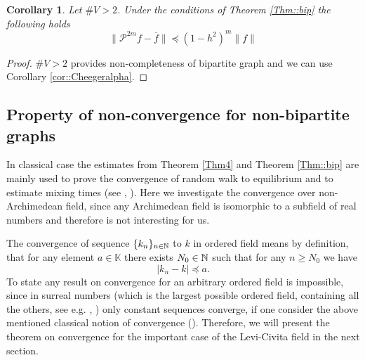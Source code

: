 \documentclass[a4paper,12pt]{amsart}
\newtheorem{corollary}{Corollary}
\theoremstyle{definition}
\renewcommand{\P}{\mathcal{P}}
\newcommand{\K}{\mathbb{K}}
\begin{document}
\begin{corollary}\label{Cor3}
Let $\#V>2$. Under the conditions of Theorem \ref{Thm::bip}  the following holds
$$
\|\P^{2m} f - \overline f\|\preceq \left({1-h^2}\right)^{m} \|f\|
$$
\end{corollary}
\begin{proof}
$\#V>2$ provides non-completeness of bipartite graph and we can use Corollary \ref{cor::Cheegeralpha}.
\end{proof}

\subsection{Property of non-convergence for non-bipartite graphs}
In classical case the estimates from Theorem \ref{Thm4} and Theorem \ref{Thm::bip} are mainly used to prove the convergence of random walk to equilibrium and to estimate mixing times (see \cite{Grigoryan}, \cite{LPW}). Here we investigate the convergence over non-Archimedean field, since any Archimedean field is isomorphic to a subfield of real numbers and therefore is not interesting for us.

The convergence of sequence $\{k_n\}_{n\in \Bbb N}$ to $k$ in ordered field means by definition, that for any element $a\in \K$ there exists $N_0\in \Bbb N$ such that for any $n\ge N_0$ we have
$$
|k_n-k|\preceq a.
$$
To state any result on convergence for an arbitrary ordered field is impossible, since in surreal numbers (which is the largest possible ordered field, containing all the others, see e.g. \cite{Conway}, \cite[Theorem 24.29]{BB}) only constant sequences converge, if one consider the above mentioned classical notion of convergence (\cite[Theorem 16]{RSS}). Therefore, we will present the theorem on convergence for the important case of the Levi-Civita field in the next section.
\end{document}
